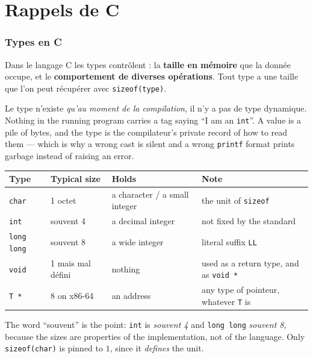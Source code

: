 \section{Rappels de C}

\subsubsection{Types en C}
Dans le langage C les types contrôlent : la \textbf{taille en mémoire} que la
donnée occupe, et le \textbf{comportement de diverses opérations}. Tout type a
une taille que l'on peut récupérer avec \verb|sizeof(type)|.

\begin{remark}
  Le type n'existe \textit{qu'au moment de la compilation}, il n'y a pas de type
  dynamique. Nothing in the running program carries a tag saying ``I am an
  \verb|int|''. A value is a pile of bytes, and the type is the compilateur's
  private record of how to read them --- which is why a wrong cast is silent
  and a wrong \verb|printf| format prints garbage instead of raising an error.
\end{remark}

\begin{center}
\begin{tabular}{llll}
  \toprule
  Type & Typical size & Holds & Note \\
  \midrule
  \verb|char|      & 1 octet  & a character / a small integer & the unit of \verb|sizeof| \\
  \verb|int|       & souvent 4 & a decimal integer             & not fixed by the standard \\
  \verb|long long| & souvent 8 & a wide integer                & literal suffix \verb|LL| \\
  \verb|void|      & 1 mais mal défini & nothing             & used as a return type, and as \verb|void *| \\
  \verb|T *|       & 8 on x86-64 & an address                & any type of pointeur, whatever \verb|T| is \\
  \bottomrule
\end{tabular}
\end{center}

The word ``souvent'' is the point: \verb|int| is \textit{souvent 4} and
\verb|long long| \textit{souvent 8}, because the sizes are properties of the
implementation, not of the language. Only \verb|sizeof(char)| is pinned to $1$,
since it \textit{defines} the unit.\\

